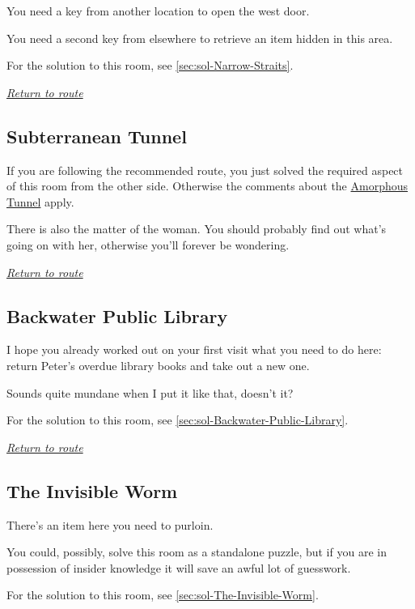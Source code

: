 \documentclass[a5paper]{extarticle}
\begin{document}
You need a key from another location to open the west door.

You need a second key from elsewhere to retrieve an item hidden in this area.

For the solution to this room, see \cref{sec:sol-Narrow-Straits}.

\hyperref[sec:route-12]{\emph{Return to route}}

\newpage
\subsection{Subterranean Tunnel}\label{sec:req-Subterranean-Tunnel}

If you are following the recommended route,
you just solved the required aspect of this room from the other side.
Otherwise the comments about the
\hyperref[sec:req-Amorphous-Tunnel]{Amorphous Tunnel} apply.

There is also the matter of the woman.
You should probably find out what's going on with her,
otherwise you'll forever be wondering.

\hyperref[sec:route-12]{\emph{Return to route}}

\newpage
\subsection{Backwater Public Library}\label{sec:req-Backwater-Public-Library}

I hope you already worked out on your first visit what you need to do here:
return Peter's overdue library books and take out a new one.

Sounds quite mundane when I put it like that, doesn't it?

For the solution to this room, see \cref{sec:sol-Backwater-Public-Library}.

\hyperref[sec:route-12]{\emph{Return to route}}

\newpage
\subsection{The Invisible Worm}\label{sec:req-The-Invisible-Worm}

There's an item here you need to purloin.

You could, possibly, solve this room as a standalone puzzle,
but if you are in possession of insider knowledge it will save an awful lot of guesswork.

For the solution to this room, see \cref{sec:sol-The-Invisible-Worm}.
\end{document}
